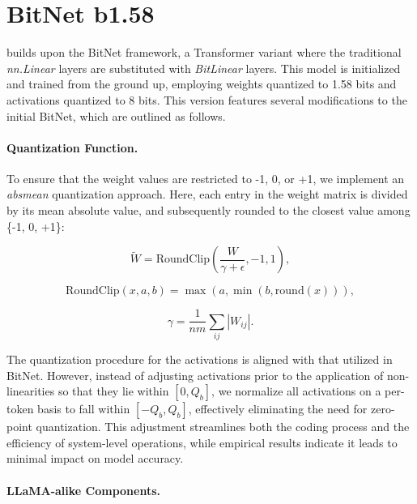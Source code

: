 \section{BitNet b1.58}

 builds upon the BitNet framework, a Transformer variant where the traditional \emph{nn.Linear} layers are substituted with \emph{BitLinear} layers. This model is initialized and trained from the ground up, employing weights quantized to 1.58 bits and activations quantized to 8 bits. This version features several modifications to the initial BitNet, which are outlined as follows.

\paragraph{Quantization Function.} To ensure that the weight values are restricted to -1, 0, or +1, we implement an \emph{absmean} quantization approach. Here, each entry in the weight matrix is divided by its mean absolute value, and subsequently rounded to the closest value among \{-1, 0, +1\}:

\begin{equation}
    \widetilde{W} = \mathrm{RoundClip}(\frac{W}{\gamma + \epsilon}, -1, 1),
\end{equation}

\begin{equation}
    \mathrm{RoundClip}(x, a, b) = \max(a, \min(b, \mathrm{round}(x))),
\end{equation}

\begin{equation}
    \gamma = \frac{1}{nm}\sum_{ij} |W_{ij}|.
\end{equation}

The quantization procedure for the activations is aligned with that utilized in BitNet. However, instead of adjusting activations prior to the application of non-linearities so that they lie within $[0, Q_b]$, we normalize all activations on a per-token basis to fall within $[-Q_b, Q_b]$, effectively eliminating the need for zero-point quantization. This adjustment streamlines both the coding process and the efficiency of system-level operations, while empirical results indicate it leads to minimal impact on model accuracy.

\paragraph{LLaMA-alike Components.}


